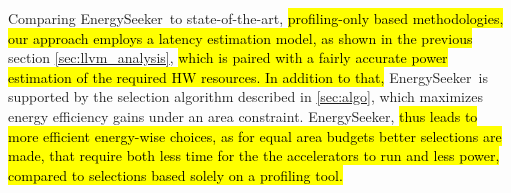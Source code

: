 \documentclass[]{usiinfthesis}
\newcommand{\eseeker}{{EnergySeeker}}
\newcommand{\SoTA}{{state-of-the-art}}
\begin{document}
Comparing \eseeker\ to \SoTA, 
\hl{
profiling-only based methodologies,
our approach employs a latency estimation model, as shown in the previous 
}
section \ref{sec:llvm_analysis}, 
\hl{
which is paired with a fairly accurate power estimation of the required HW resources. 
In addition to that, 
}
\eseeker\ is supported by the selection algorithm described in \ref{sec:algo}, which maximizes
energy efficiency gains under an area constraint. \eseeker, 
\hl{
thus leads to more efficient energy-wise choices, as for equal area budgets better selections are made, that require both less time for the the accelerators to run and less power, compared to selections based solely on a profiling tool.
}
\end{document}
